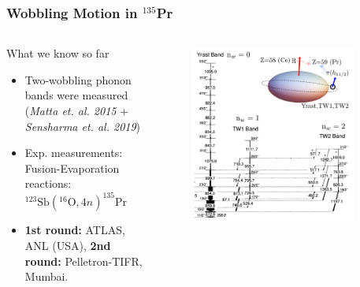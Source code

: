 \documentclass{beamer}
\begin{document}
\begin{frame}
    \frametitle{Wobbling Motion in $^{135}$Pr}
	\begin{columns}
		\begin{column}{0.4\textwidth}
			\begin{block}{What we know so far}
				\begin{itemize}
					\item Two-wobbling phonon bands were measured (\textit{Matta et. al. 2015} + \textit{Sensharma et. al. 2019})
					\item Exp. measurements: Fusion-Evaporation reactions: $^{123}\text{Sb}\left(^{16}\text{O},4n\right)^{135}\text{Pr}$
					\item \textbf{1st round:} ATLAS, ANL (USA), \textbf{2nd round:} Pelletron-TIFR, Mumbai.
				\end{itemize}
			\end{block}
		\end{column}
		\begin{column}{0.6\textwidth}
			\begin{figure}
				\centering
				\includegraphics[width=0.9\textwidth]{figures/pr-135-exp-data.pdf}
			\end{figure}
		\end{column}
	\end{columns}
\end{frame}
\end{document}
